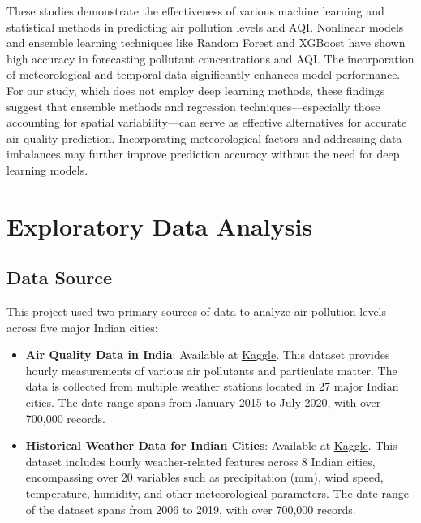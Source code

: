 \documentclass[twoside,11pt]{article}
\begin{document}
These studies demonstrate the effectiveness of various machine learning and statistical methods in predicting air pollution levels and AQI. Nonlinear models and ensemble learning techniques like Random Forest and XGBoost have shown high accuracy in forecasting pollutant concentrations and AQI. The incorporation of meteorological and temporal data significantly enhances model performance. For our study, which does not employ deep learning methods, these findings suggest that ensemble methods and regression techniques—especially those accounting for spatial variability—can serve as effective alternatives for accurate air quality prediction. Incorporating meteorological factors and addressing data imbalances may further improve prediction accuracy without the need for deep learning models.

\newpage






\section{Exploratory Data Analysis}

\subsection{Data Source}

This project used two primary sources of data to analyze air pollution levels across five major Indian cities:

\begin{itemize}
    \item \textbf{Air Quality Data in India}: Available at \href{https://www.kaggle.com/datasets/rohanrao/air-quality-data-in-india}{\uline{Kaggle}}. This dataset provides hourly measurements of various air pollutants and particulate matter. The data is collected from multiple weather stations located in 27 major Indian cities. The date range spans from January 2015 to July 2020, with over 700,000 records.

    \item \textbf{Historical Weather Data for Indian Cities}: Available at \href{https://www.kaggle.com/datasets/hiteshsoneji/historical-weather-data-for-indian-cities}{\uline{Kaggle}}. This dataset includes hourly weather-related features across 8 Indian cities, encompassing over 20 variables such as precipitation (mm), wind speed, temperature, humidity, and other meteorological parameters. The date range of the dataset spans from 2006 to 2019, with over 700,000 records. \citep{hitesh_soneji_2020}
\end{itemize}
\end{document}
